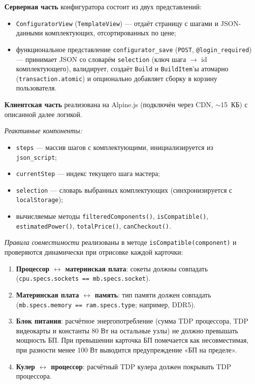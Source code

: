 \textbf{Серверная часть} конфигуратора состоит из двух представлений:
\begin{itemize}
    \item \texttt{ConfiguratorView} (\texttt{TemplateView}) --- отдаёт страницу с шагами и JSON-данными комплектующих, отсортированных по цене;
    \item функциональное представление \texttt{configurator\_save} (\texttt{POST}, \texttt{@login\_required}) --- принимает JSON со словарём \texttt{selection} (ключ шага $\rightarrow$ id комплектующего), валидирует, создаёт \texttt{Build} и \texttt{BuildItem}'ы атомарно (\texttt{transaction.atomic}) и опционально добавляет сборку в корзину пользователя.
\end{itemize}

\textbf{Клиентская часть} реализована на Alpine.js (подключён через CDN, ${\sim}$15~КБ) с описанной далее логикой.

\emph{Реактивные компоненты:}
\begin{itemize}
    \item \texttt{steps} --- массив шагов с комплектующими, инициализируется из \texttt{json\_script};
    \item \texttt{currentStep} --- индекс текущего шага мастера;
    \item \texttt{selection} --- словарь выбранных комплектующих (синхронизируется с \texttt{localStorage});
    \item вычисляемые методы \texttt{filteredComponents()}, \texttt{isCompatible()}, \texttt{estimatedPower()}, \texttt{totalPrice()}, \texttt{canCheckout()}.
\end{itemize}

\emph{Правила совместимости} реализованы в методе \texttt{isCompatible(component)} и проверяются динамически при отрисовке каждой карточки:
\begin{enumerate}
    \item \textbf{Процессор $\leftrightarrow$ материнская плата}: сокеты должны совпадать (\texttt{cpu.specs.sockets == mb.specs.socket}).
    \item \textbf{Материнская плата $\leftrightarrow$ память}: тип памяти должен совпадать (\texttt{mb.specs.memory == ram.specs.type}; например, DDR5).
    \item \textbf{Блок питания}: расчётное энергопотребление (сумма TDP процессора, TDP видеокарты и константы 80 Вт на остальные узлы) не должно превышать мощность БП. При превышении карточка БП помечается как несовместимая, при разности менее 100 Вт выводится предупреждение «БП на пределе».
    \item \textbf{Кулер $\leftrightarrow$ процессор}: расчётный TDP кулера должен покрывать TDP процессора.
\end{enumerate}


